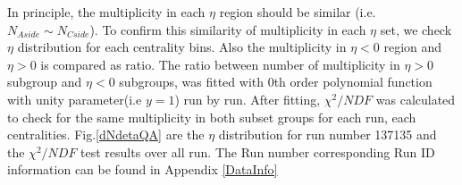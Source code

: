  In principle, the multiplicity in each $\eta$ region should be similar (i.e. $N_{Aside} \sim N_{Cside}$). To confirm this similarity of multiplicity in each $\eta$ set, we check $\eta$ distribution for each centrality bins. Also the multiplicity in $\eta < 0$ region  and $\eta > 0$ is compared as ratio. The ratio between number of multiplicity in $\eta>0 $ subgroup and $\eta<0$ subgroups,
was fitted with 0th order polynomial function with unity parameter(i.e $y=1$) run by run. After fitting, $\chi^2 / NDF$ was calculated to check for the same multiplicity in both subset groups for each run, each centralities.  Fig.\ref{dNdetaQA} are the $\eta$ distribution for run number 137135 and the $\chi^2/NDF$ test results over all run. The Run number corresponding Run ID information can be found in Appendix \ref{DataInfo}


